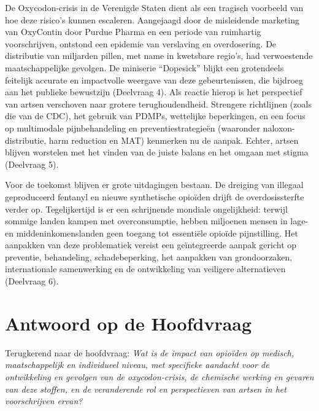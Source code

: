 \documentclass[11pt, a4paper]{report} %
\begin{document}
De Oxycodon-crisis in de Verenigde Staten dient als een tragisch voorbeeld van hoe deze risico's kunnen escaleren. Aangejaagd door de misleidende marketing van OxyContin door Purdue Pharma en een periode van ruimhartig voorschrijven, ontstond een epidemie van verslaving en overdosering. De distributie van miljarden pillen, met name in kwetsbare regio's, had verwoestende maatschappelijke gevolgen. De miniserie \enquote{Dopesick} blijkt een grotendeels feitelijk accurate en impactvolle weergave van deze gebeurtenissen, die bijdroeg aan het publieke bewustzijn (Deelvraag 4). Als reactie hierop is het perspectief van artsen verschoven naar grotere terughoudendheid. Strengere richtlijnen (zoals die van de CDC), het gebruik van PDMPs, wettelijke beperkingen, en een focus op multimodale pijnbehandeling en preventiestrategieën (waaronder naloxon-distributie, harm reduction en MAT) kenmerken nu de aanpak. Echter, artsen blijven worstelen met het vinden van de juiste balans en het omgaan met stigma (Deelvraag 5).

Voor de toekomst blijven er grote uitdagingen bestaan. De dreiging van illegaal geproduceerd fentanyl en nieuwe synthetische opioïden drijft de overdosissterfte verder op. Tegelijkertijd is er een schrijnende mondiale ongelijkheid: terwijl sommige landen kampen met overconsumptie, hebben miljoenen mensen in lage- en middeninkomenslanden geen toegang tot essentiële opioïde pijnstilling. Het aanpakken van deze problematiek vereist een geïntegreerde aanpak gericht op preventie, behandeling, schadebeperking, het aanpakken van grondoorzaken, internationale samenwerking en de ontwikkeling van veiligere alternatieven (Deelvraag 6).

\section{Antwoord op de Hoofdvraag}
Terugkerend naar de hoofdvraag: \textit{Wat is de impact van opioïden op medisch, maatschappelijk en individueel niveau, met specifieke aandacht voor de ontwikkeling en gevolgen van de oxycodon-crisis, de chemische werking en gevaren van deze stoffen, en de veranderende rol en perspectieven van artsen in het voorschrijven ervan?}
\end{document}
